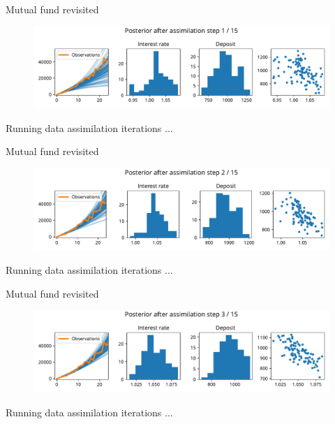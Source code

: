 \documentclass[12pt, aspectratio=149]{beamer}
\theoremstyle{plain}
\begin{document}
\begin{frame}[fragile]{Mutual fund revisited}
\vspace*{-1em}
\begin{center}
 \begin{figure}
    	\centering
    	\includegraphics[width=0.99\linewidth]{figures/esmda_step_1.pdf}
 \end{figure}
  Running data assimilation iterations ...
 \end{center}
\end{frame}

\begin{frame}[fragile]{Mutual fund revisited}
\vspace*{-1em}
\begin{center}
 \begin{figure}
    	\centering
    	\includegraphics[width=0.99\linewidth]{figures/esmda_step_2.pdf}
 \end{figure}
   Running data assimilation iterations ...
 \end{center}
\end{frame}

\begin{frame}[fragile]{Mutual fund revisited}
\vspace*{-1em}
\begin{center}
 \begin{figure}
    	\centering
    	\includegraphics[width=0.99\linewidth]{figures/esmda_step_3.pdf}
 \end{figure}
   Running data assimilation iterations ...
 \end{center}
\end{frame}
\end{document}

